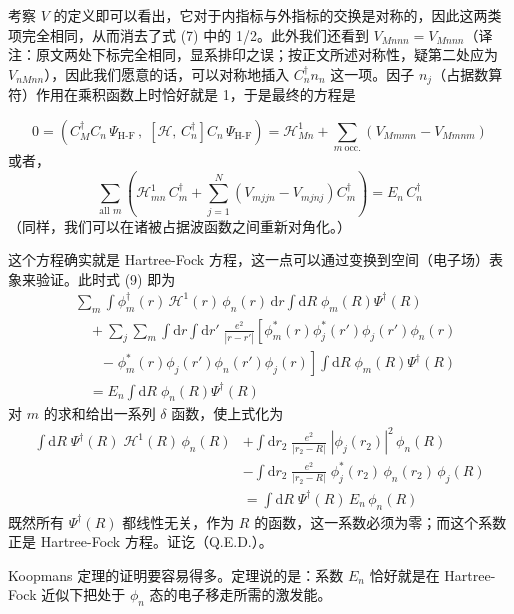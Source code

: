 考察 $V$ 的定义即可以看出，它对于内指标与外指标的交换是对称的，因此这两类项完全相同，从而消去了式 (7) 中的 1/2。此外我们还看到 $V_{Mnnn} = V_{Mnnn}$（译注：原文两处下标完全相同，显系排印之误；按正文所述对称性，疑第二处应为 $V_{nMnn}$），因此我们愿意的话，可以对称地插入 $C_n^{\dagger} n_n$ 这一项。因子 $n_j$（占据数算符）作用在乘积函数上时恰好就是 1，于是最终的方程是

\begin{equation*}
0 = \left(C_M^{\dagger} C_n\,\Psi_{\text{H-F}}\,,\; \left[\mathcal{H},\, C_n^{\dagger}\right] C_n\,\Psi_{\text{H-F}}\right) = \mathcal{H}^1_{Mn} + \sum_{m\ \text{occ.}}\left(V_{Mmmn} - V_{Mmnm}\right)
\end{equation*}
或者，
\begin{equation*}
\sum_{\text{all }m}\left(\mathcal{H}^1_{mn}\, C_m^{\dagger} + \sum_{j=1}^{N}\left(V_{mjjn} - V_{mjnj}\right)C_m^{\dagger}\right) = E_n\, C_n^{\dagger}
\tag{9}
\end{equation*}
（同样，我们可以在诸被占据波函数之间重新对角化。）

这个方程确实就是 Hartree-Fock 方程，这一点可以通过变换到空间（电子场）表象来验证。此时式 (9) 即为
\begin{align*}
&\sum_m \int \phi_m^{\dagger}(r)\,\mathcal{H}^1(r)\,\phi_n(r)\,\mathrm{d}r \int \mathrm{d}R\;\phi_m(R)\Psi^{\dagger}(R) \\
&\quad+\sum_j\sum_m \int \mathrm{d}r \int \mathrm{d}r'\;\frac{e^2}{|r-r'|}\left[\phi_m^{*}(r)\phi_j^{*}(r')\phi_j(r')\phi_n(r)\right.\\
&\qquad\left.-\;\phi_m^{*}(r)\phi_j(r')\phi_n(r')\phi_j(r)\right]\int \mathrm{d}R\;\phi_m(R)\Psi^{\dagger}(R)\\
&\quad=E_n \int \mathrm{d}R\;\phi_n(R)\Psi^{\dagger}(R)
\end{align*}
对 $m$ 的求和给出一系列 $\delta$ 函数，使上式化为
\begin{align*}
\int \mathrm{d}R\;\Psi^{\dagger}(R)\;\mathcal{H}^1(R)\,\phi_n(R) &+ \int \mathrm{d}r_2\;\frac{e^2}{|r_2-R|}\;|\phi_j(r_2)|^2\,\phi_n(R) \\
&- \int \mathrm{d}r_2\;\frac{e^2}{|r_2-R|}\;\phi_j^{*}(r_2)\,\phi_n(r_2)\,\phi_j(R) \\
&= \int \mathrm{d}R\;\Psi^{\dagger}(R)\,E_n\,\phi_n(R)
\end{align*}
既然所有 $\Psi^{\dagger}(R)$ 都线性无关，作为 $R$ 的函数，这一系数必须为零；而这个系数正是 Hartree-Fock 方程。证讫（Q.E.D.）。

Koopmans 定理的证明要容易得多。定理说的是：系数 $E_n$ 恰好就是在 Hartree-Fock 近似下把处于 $\phi_n$ 态的电子移走所需的激发能。

